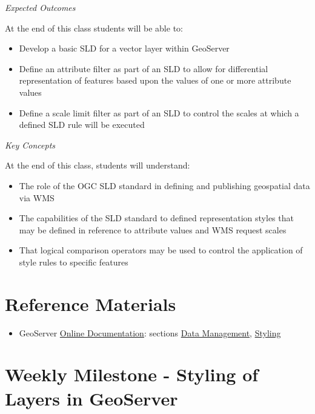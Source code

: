 \documentclass[]{book}
\providecommand{\tightlist}{%
  \setlength{\itemsep}{0pt}\setlength{\parskip}{0pt}}
\begin{document}
\emph{Expected Outcomes}

At the end of this class students will be able to:

\begin{itemize}
\tightlist
\item
  Develop a basic SLD for a vector layer within GeoServer
\item
  Define an attribute filter as part of an SLD to allow for differential
  representation of features based upon the values of one or more
  attribute values
\item
  Define a scale limit filter as part of an SLD to control the scales at
  which a defined SLD rule will be executed
\end{itemize}

\emph{Key Concepts}

At the end of this class, students will understand:

\begin{itemize}
\tightlist
\item
  The role of the OGC SLD standard in defining and publishing geospatial
  data via WMS
\item
  The capabilities of the SLD standard to defined representation styles
  that may be defined in reference to attribute values and WMS request
  scales
\item
  That logical comparison operators may be used to control the
  application of style rules to specific features
\end{itemize}

\section{Reference Materials}\label{week14-reference}

\begin{itemize}
\tightlist
\item
  GeoServer
  \href{http://docs.geoserver.org/stable/en/user/index.html}{Online
  Documentation}: sections
  \href{http://docs.geoserver.org/latest/en/user/data/index.html\#data}{Data
  Management},
  \href{http://docs.geoserver.org/latest/en/user/styling/index.html\#styling}{Styling}
\end{itemize}

\section{Weekly Milestone - Styling of Layers in
GeoServer}\label{weekly-milestone---styling-of-layers-in-geoserver}
\end{document}
